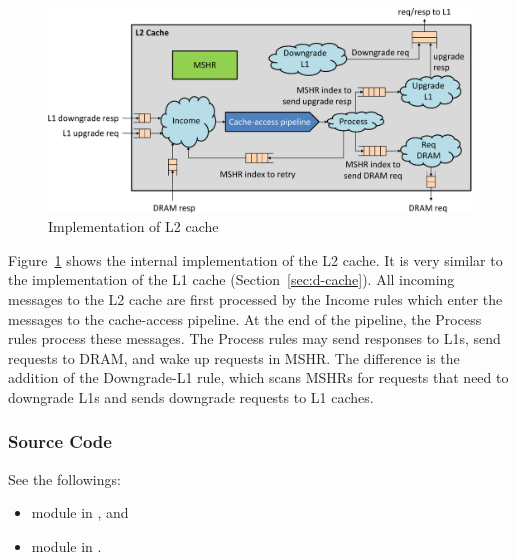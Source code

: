 \begin{figure}
    \centering
    \includegraphics[width=\columnwidth]{fig/l2_cache_crop.pdf}
    \caption{Implementation of L2 cache}\label{fig:l2-cache-impl}
\end{figure}

Figure~\ref{fig:l2-cache-impl} shows the internal implementation of the L2 cache.
It is very similar to the implementation of the L1 cache (Section~\ref{sec:d-cache}).
All incoming messages to the L2 cache are first processed by the Income rules which enter the messages to the cache-access pipeline.
At the end of the pipeline, the Process rules process these messages.
The Process rules may send responses to L1s, send requests to DRAM, and wake up requests in MSHR.
The difference is the addition of the Downgrade-L1 rule, which scans MSHRs for requests that need to downgrade L1s and sends downgrade requests to L1 caches.

\subsubsection{Source Code}
See the followings:
\begin{itemize}
    \item module  in , and
    \item module  in .
\end{itemize}
